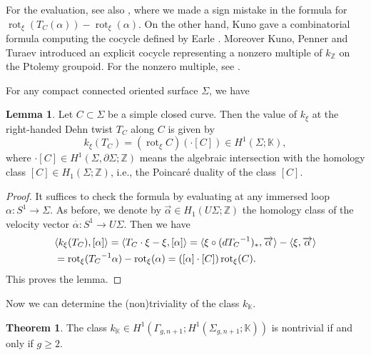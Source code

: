\documentclass[a4paper,12pt, twoside]{amsart}
\theoremstyle{definition}
\newtheorem{thm}[dfn]{Theorem}
\newtheorem{lem}[dfn]{Lemma}
\theoremstyle{remark}
\numberwithin{equation}{section}
\newcommand\bK{{\mathbb{K}}}
\newcommand\bZ{{\mathbb{Z}}}
\newcommand\inv{^{-1}}
\newcommand\pa{\partial}
\newcommand\rot{\operatorname{rot}}
\begin{document}
For the evaluation, see also \cite[Theorem 1.3]{KS1}, where we made a sign mistake in the formula for $\rot_\xi(T_C(\alpha)) - \rot_\xi(\alpha)$. 
On the other hand, Kuno \cite{Ku09} gave a combinatorial formula computing the cocycle defined by Earle \cite{E78}. Moreover Kuno, Penner and Turaev \cite{KPT} introduced an explicit cocycle representing a nonzero multiple of $k_\bZ$ on the Ptolemy groupoid. For the nonzero multiple, see \cite[Theorem 2.5]{Ku17}.
\par
For any compact connected oriented surface $\Sigma$, we have
\begin{lem}\label{lem:DT}
Let $C \subset \Sigma$ be a simple closed curve. Then the value of $k_\xi$ at the right-handed Dehn twist $T_C$ along $C$ is given by
$$
k_\xi(T_C) = (\rot_\xi C)(\cdot [C]) \in H^1(\Sigma; \bK),
$$
where $\cdot [C]\in H^1(\Sigma, \pa \Sigma; \bZ)$ means the algebraic intersection with the homology class $[C] \in H_1(\Sigma; \bZ)$, i.e., the Poincar\'e duality of the class $[C]$. 
\end{lem}
\begin{proof} It suffices to check the formula by evaluating at any immersed loop $\alpha: S^1 \to \Sigma$. As before, we denote by $\overrightarrow{\alpha} \in H_1(U\Sigma; \bZ)$ the homology class of the velocity vector $\overset\cdot\alpha: S^1 \to U\Sigma$. Then we have 
$$
\aligned
& \langle k_\xi(T_C), [\alpha]\rangle
= \langle T_C\cdot \xi - \xi, [\alpha]\rangle
= \langle \xi \circ (d{T_C}\inv)_*, \overrightarrow{\alpha}\rangle -\langle \xi, \overrightarrow{\alpha}\rangle\\
&= \rot_\xi({T_C}\inv \alpha) - \rot_\xi(\alpha) =  ([\alpha]\cdot[C])\rot_\xi(C).
\endaligned
$$
This proves the lemma. 
\end{proof}
Now we can determine the (non)triviality of the class $k_{\bK}$.
\begin{thm}\label{thm:nontrivial} The class $k_\bK \in H^1(\Gamma_{g,n+1}; H^1(\Sigma_{g,n+1}; \bK))$ is nontrivial if and only if $g \geq 2$.
\end{thm} 
\end{document}
